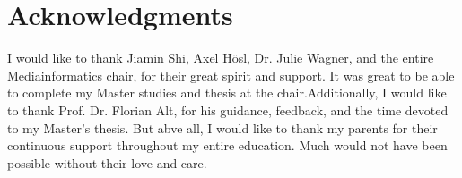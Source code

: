 
\section*{Acknowledgments}

I would like to thank Jiamin Shi, Axel H{\"o}sl, Dr. Julie Wagner, and the entire Mediainformatics chair, for their great spirit and support. It was great to be able to complete my Master studies and thesis at the chair.Additionally, I would like to thank Prof. Dr. Florian Alt, for his guidance, feedback, and the time devoted to my Master's thesis. But abve all, I would like to thank my parents for their continuous support throughout my entire education. Much would not have been possible without their love and care. 
